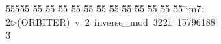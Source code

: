 %
%
\begin{tabbing}
55555 \= 55 \= 55 \= 55 \= 55 \= 55 \= 55 \= 55 \= 55 \= 55 \= 55 \= 55 \= 55 \= \>im7:\\[0pt]
2\>$\triangleright$\>(ORBITER)\ v\ 2\ inverse\_mod\ 3221\ 15796188\\[0pt]
3\>\end{tabbing}
